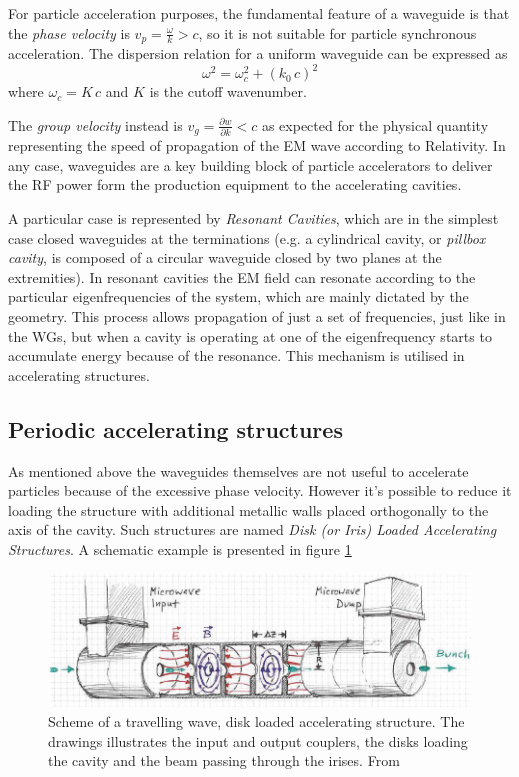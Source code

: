For particle acceleration purposes, the fundamental feature of a waveguide is that the \textit{phase velocity} is $v_p = \frac{\omega}{k} > c$, so it is not suitable for particle synchronous acceleration. The dispersion relation for a uniform waveguide can be expressed as 
\begin{equation}
\omega^2 = \omega^2_c + (k_0 \, c)^2
\end{equation}
where $\omega_c = K \, c$ and $K$ is the cutoff wavenumber.

The \textit{group velocity} instead is $v_g = \frac{\partial w}{\partial k} < c$ as expected for the physical quantity representing the speed of propagation of the EM wave according to Relativity. 
In any case, waveguides are a key building block of particle accelerators to deliver the RF power form the production equipment to the accelerating cavities.

A particular case is represented by \textit{Resonant Cavities}, which are in the simplest case closed waveguides at the terminations (e.g. a cylindrical cavity, or \textit{pillbox cavity}, is composed of a circular waveguide closed by two planes at the extremities). In resonant cavities the EM field can resonate according to the particular eigenfrequencies of the system, which are mainly dictated by the geometry. This process allows propagation of just a set of frequencies, just like in the WGs, but when a cavity is operating at one of the eigenfrequency starts to accumulate energy because of the resonance. This mechanism is utilised in accelerating structures.


\subsection[Periodic accelerating structures]{Periodic accelerating structures}

As mentioned above the waveguides themselves are not useful to accelerate particles because of the excessive phase velocity. However it's possible to reduce it loading the structure with additional metallic walls placed orthogonally to the axis of the cavity.  Such structures are named \textit{Disk (or Iris) Loaded Accelerating Structures}. A schematic example is presented in figure \ref{ACS_scheme}

\begin{figure}[h]
\centering

\includegraphics[scale=0.45]{pictures/scheme_ACS}
\caption{Scheme of a travelling wave, disk loaded accelerating structure. The drawings illustrates the input and output couplers, the disks loading the cavity and the beam passing through the irises. From \cite{streun}}
\label{ACS_scheme}

\end{figure}

